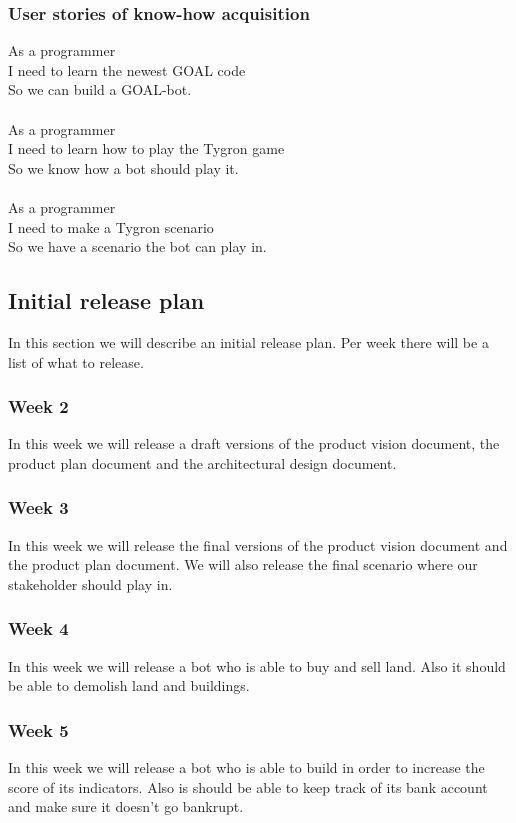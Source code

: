\subsubsection{User stories of know-how acquisition}
As a programmer\\
I need to learn the newest GOAL code\\
So we can build a GOAL-bot.\\
\\
As a programmer\\
I need to learn how to play the Tygron game\\
So we know how a bot should play it.\\
\\
As a programmer\\
I need to make a Tygron scenario\\
So we have a scenario the bot can play in.\\

\subsection{Initial release plan }
In this section we will describe an initial release plan. Per week there will be a list of what to release.

\subsubsection{Week 2}
In this week we will release a draft versions of the product vision document, the product plan document and the architectural design document.

\subsubsection{Week 3}
In this week we will release the final versions of the product vision document and the product plan document. We will also release the final scenario where our stakeholder should play in.

\subsubsection{Week 4}
In this week we will release a bot who is able to buy and sell land. Also it should be able to demolish land and buildings.

\subsubsection{Week 5}
In this week we will release a bot who is able to build in order to increase the score of its indicators. Also is should be able to keep track of its bank account and make sure it doesn't go bankrupt.

